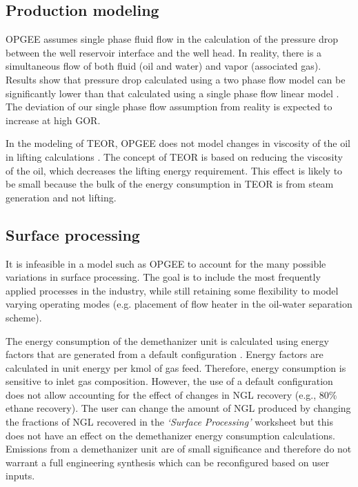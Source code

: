 \documentclass[11pt]{report}
\newcommand{\sheet}[1]{\textit{`{#1}'}}
\begin{document}
{{{{\subsection{Production modeling}
OPGEE assumes single phase fluid flow in the calculation of the pressure drop between the well reservoir interface and the well head. In reality, there is a simultaneous flow of both fluid (oil and water) and vapor (associated gas). Results show that pressure drop calculated using a two phase flow model can be significantly lower than that calculated using a single phase flow linear model \cite{Clegg2007}. The deviation of our single phase flow assumption from reality is expected to increase at high GOR. \par

In the modeling of TEOR, OPGEE does not model changes in viscosity of the oil in lifting calculations \cite{Green1998}. The concept of TEOR is based on reducing the viscosity of the oil, which decreases the lifting energy requirement. This effect is likely to be small because the bulk of the energy consumption in TEOR is from steam generation and not lifting.\par


\subsection{Surface processing}

It is infeasible in a model such as OPGEE to account for the many possible variations in surface processing. The goal is to include the most frequently applied processes in the industry, while still retaining some flexibility to model varying operating modes (e.g. placement of flow heater in the oil-water separation scheme).\par

The energy consumption of the demethanizer unit is calculated using energy factors that are generated from a default configuration \cite{Nawaz2010}. Energy factors are calculated in unit energy per kmol of gas feed. Therefore, energy consumption is sensitive to inlet gas composition. However, the use of a default configuration does not allow accounting for the effect of changes in NGL recovery (e.g., 80\% ethane recovery). The user can change the amount of NGL produced by changing the fractions of NGL recovered in the \sheet{Surface Processing} worksheet but this does not have an effect on the demethanizer energy consumption calculations. Emissions from a demethanizer unit are of small significance and therefore do not warrant a full engineering synthesis which can be reconfigured based on user inputs.\par

}}}}
\end{document}
